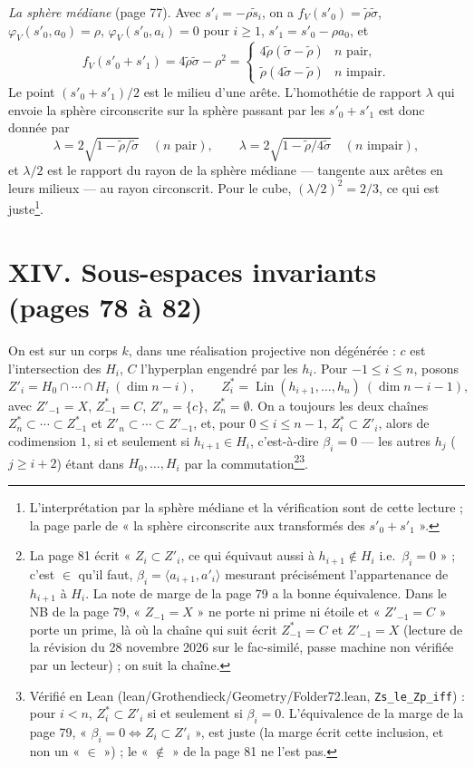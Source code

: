 \documentclass[11pt,a4paper]{article}
\begin{document}
\emph{La sphère médiane} (page 77). Avec $s'_i = -\rho\tilde s_i$, on a
$f_V(s'_0) = \tilde\rho\tilde\sigma$, $\varphi_V(s'_0, a_0) = \rho$,
$\varphi_V(s'_0, a_i) = 0$ pour $i \geqslant 1$, $s'_1 = s'_0 - \rho a_0$, et
\[
f_V(s'_0 + s'_1) = 4\tilde\rho\tilde\sigma - \rho^2 =
\begin{cases} 4\tilde\rho(\tilde\sigma - \tilde\rho) & n \text{ pair}, \\
\tilde\rho(4\tilde\sigma - \tilde\rho) & n \text{ impair}. \end{cases}
\]
Le point $(s'_0 + s'_1)/2$ est le milieu d'une arête. L'homothétie de rapport
$\lambda$ qui envoie la sphère circonscrite sur la sphère passant par les
$s'_0 + s'_1$ est donc donnée par
\[
\lambda = 2\sqrt{1 - \tilde\rho/\tilde\sigma} \quad (n \text{ pair}), \qquad
\lambda = 2\sqrt{1 - \tilde\rho/4\tilde\sigma} \quad (n \text{ impair}),
\]
et $\lambda/2$ est le rapport du rayon de la sphère médiane --- tangente aux
arêtes en leurs milieux --- au rayon circonscrit. Pour le cube, $(\lambda/2)^2
= 2/3$, ce qui est juste\footnote{L'interprétation par la sphère médiane et la
vérification sont de cette lecture ; la page parle de « la sphère circonscrite
aux transformés des $s'_0 + s'_1$ ».}.

\section*{XIV. Sous-espaces invariants (pages 78 à 82)}

On est sur un corps $k$, dans une réalisation projective non dégénérée : $c$
est l'intersection des $H_i$, $C$ l'hyperplan engendré par les $h_i$. Pour $-1
\leqslant i \leqslant n$, posons
\[
Z'_i = H_0 \cap \cdots \cap H_i \ (\dim n - i), \qquad Z^*_i =
\operatorname{Lin}(h_{i+1}, \ldots, h_n) \ (\dim n - i - 1),
\]
avec $Z'_{-1} = X$, $Z^*_{-1} = C$, $Z'_n = \{c\}$, $Z^*_n = \emptyset$. On a
toujours les deux chaînes $Z^*_n \subset \cdots \subset Z^*_{-1}$ et $Z'_n
\subset \cdots \subset Z'_{-1}$, et, pour $0 \leqslant i \leqslant n-1$, $Z^*_i
\subset Z'_i$, alors de codimension $1$, si et seulement si $h_{i+1} \in H_i$, c'est-à-dire $\beta_i = 0$ --- les autres
$h_j$ ($j \geqslant i + 2$) étant dans $H_0, \ldots, H_i$ par la
commutation\footnote{La page 81 écrit « $Z_i \subset Z'_i$, ce qui équivaut
aussi à $h_{i+1} \notin H_i$ i.e.\ $\beta_i = 0$ » ; c'est $\in$ qu'il faut,
$\beta_i = \langle a_{i+1}, a'_i \rangle$ mesurant précisément l'appartenance de
$h_{i+1}$ à $H_i$. La note de marge de la page 79 a la bonne équivalence. Dans
le NB de la page 79, « $Z_{-1} = X$ » ne porte ni prime ni étoile et
« $Z'_{-1} = C$ » porte un prime, là où la chaîne qui suit écrit
$Z^*_{-1} = C$ et $Z'_{-1} = X$ (lecture de la révision du 28 novembre 2026 sur
le fac-similé, passe machine non vérifiée par un lecteur) ; on suit la chaîne.}\footnote{Vérifié en Lean
(lean/Grothendieck/Geometry/Folder72.lean, \texttt{Zs\_le\_Zp\_iff}) : pour $i < n$,
$Z^*_i \subset Z'_i$ si et seulement si $\beta_i = 0$. L'équivalence de la marge
de la page 79, « $\beta_i = 0 \iff Z_i \subset Z'_i$ », est juste (la marge
écrit cette inclusion, et non un « $\in$ ») ; le « $\notin$ » de la page 81 ne
l'est pas.}.
\end{document}
